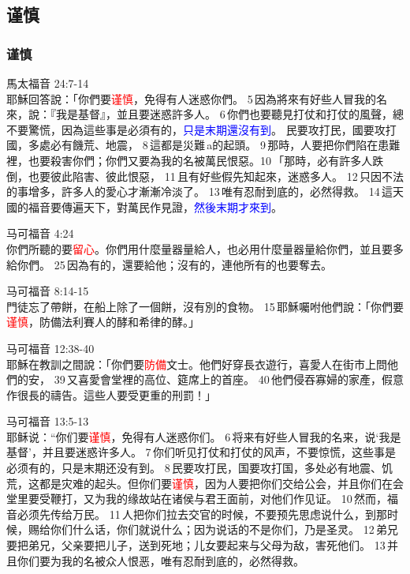 \subsection{谨慎}
\subsubsection{谨慎}


馬太福音 24:7-14\\
耶穌回答說：「你們要\textcolor{red}{谨慎}，免得有人迷惑你們。 5 因為將來有好些人冒我的名來，說：『我是基督』，並且要迷惑許多人。 6 你們也要聽見打仗和打仗的風聲，總不要驚慌，因為這些事是必須有的，\textcolor{blue}{只是末期還沒有到}。
民要攻打民，國要攻打國，多處必有饑荒、地震， 8 這都是災難 a的起頭。 9 那時，人要把你們陷在患難裡，也要殺害你們；你們又要為我的名被萬民恨惡。10 「那時，必有許多人跌倒，也要彼此陷害、彼此恨惡， 11 且有好些假先知起來，迷惑多人。 12 只因不法的事增多，許多人的愛心才漸漸冷淡了。 13 唯有忍耐到底的，必然得救。 14 這天國的福音要傳遍天下，對萬民作見證，\textcolor{blue}{然後末期才來到}。

马可福音 4:24\\
你們所聽的要\textcolor{red}{留心}。你們用什麼量器量給人，也必用什麼量器量給你們，並且要多給你們。 25 因為有的，還要給他；沒有的，連他所有的也要奪去。


马可福音 8:14-15\\
門徒忘了帶餅，在船上除了一個餅，沒有別的食物。 15 耶穌囑咐他們說：「你們要\textcolor{red}{谨慎}，防備法利賽人的酵和希律的酵。」

马可福音 12:38-40\\
耶穌在教訓之間說：「你們要\textcolor{red}{防備}文士。他們好穿長衣遊行，喜愛人在街市上問他們的安， 39 又喜愛會堂裡的高位、筵席上的首座。 40 他們侵吞寡婦的家產，假意作很長的禱告。這些人要受更重的刑罰！」

马可福音 13:5-13\\
耶稣说：“你们要\textcolor{red}{谨慎}，免得有人迷惑你们。 6 将来有好些人冒我的名来，说‘我是基督’，并且要迷惑许多人。 7 你们听见打仗和打仗的风声，不要惊慌，这些事是必须有的，只是末期还没有到。 8 民要攻打民，国要攻打国，多处必有地震、饥荒，这都是灾难的起头。但你们要\textcolor{red}{谨慎}，因为人要把你们交给公会，并且你们在会堂里要受鞭打，又为我的缘故站在诸侯与君王面前，对他们作见证。 10 然而，福音必须先传给万民。 11 人把你们拉去交官的时候，不要预先思虑说什么，到那时候，赐给你们什么话，你们就说什么；因为说话的不是你们，乃是圣灵。 12 弟兄要把弟兄，父亲要把儿子，送到死地；儿女要起来与父母为敌，害死他们。 13 并且你们要为我的名被众人恨恶，唯有忍耐到底的，必然得救。

